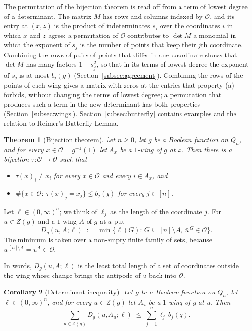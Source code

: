 \documentclass[11pt,reqno]{amsart}
\makeatletter
\newtheorem{theorem}{Theorem}[section]
\newtheorem{corollary}[theorem]{Corollary}
\theoremstyle{definition}
\theoremstyle{remark}
\numberwithin{equation}{section}
\theoremstyle{named}
\theoremstyle{plain}
\renewcommand{\subsection}{\@startsection{subsection}{2}%
  \z@{1.0\linespacing\@plus.4\linespacing\@minus.15\linespacing}{-.5em}{\normalfont\bfseries}}
\newcommand{\cO}{\mathcal{O}}
\makeatother
\begin{document}
The permutation of the bijection theorem is read off from a term of lowest degree of a determinant.
The matrix $M$ has rows
and columns indexed by $\cO$, and its entry at $(x,z)$ is the product of indeterminates $s_i$ over
the coordinates $i$ in which $x$ and $z$ agree; a permutation of $\cO$ contributes to $\det M$ a
monomial in which the exponent of $s_j$ is the number of points that keep their $j$th coordinate.
Combining the rows of pairs of points that differ in one coordinate shows that $\det M$ has many
factors $1-s_j^{2}$, so that in its terms of lowest degree the exponent of $s_j$ is at most $b_j(g)$
(Section~\ref{subsec:agreement}). Combining the rows of the points of each wing gives a matrix with
zeros at the entries that property (a) forbids, without changing the terms of lowest degree; a
permutation that produces such a term in the new determinant has both properties
(Section~\ref{subsec:wings}). Section~\ref{subsec:butterfly} contains examples and the relation to
Reimer's Butterfly Lemma.

\subsection{Statements}

\begin{theorem}[Bijection theorem]\label{thm:bij}
Let $n\ge 0$, let $g$ be a Boolean function on $Q_n$, and for every $x\in\cO=g^{-1}(1)$ let $A_x$ be
a $1$-wing of $g$ at $x$. Then there is a bijection $\tau\colon\cO\to\cO$ such that
\begin{itemize}
\item[\textup{(a)}] $\tau(x)_i\ne x_i$ for every $x\in\cO$ and every $i\in A_x$, and
\item[\textup{(b)}] $\#\{x\in\cO:\ \tau(x)_j=x_j\}\le b_j(g)$ for every $j\in[n]$.
\end{itemize}
\end{theorem}

Let $\ell\in(0,\infty)^{n}$; we think of $\ell_j$ as the length of the coordinate $j$. For
$u\in Z(g)$ and a $1$-wing $A$ of $g$ at $u$ put
\[
   D_g(u,A;\ell)\;:=\;\min\bigl\{\ell(G):\ G\subseteq[n]\setminus A,\ \bar u^{\,G}\in\cO\bigr\}.
\]
The minimum is taken over a non-empty finite family of sets, because
$\bar u^{\,[n]\setminus A}=u^{A}\in\cO$.

In words, $D_g(u,A;\ell)$ is the least total length of a
set of coordinates outside the wing whose change brings the antipode of $u$ back into $\cO$.

\begin{corollary}[Determinant inequality]\label{cor:det}
Let $g$ be a Boolean function on $Q_n$, let $\ell\in(0,\infty)^{n}$, and for every $u\in Z(g)$ let
$A_u$ be a $1$-wing of $g$ at $u$. Then
\[
   \sum_{u\in Z(g)}D_g(u,A_u;\ell)\;\le\;\sum_{j=1}^{n}\ell_j\,b_j(g).
\]
\end{corollary}
\end{document}
